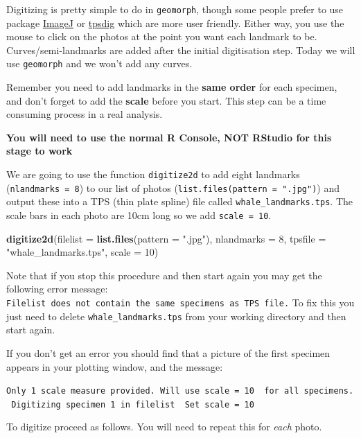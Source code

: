 \documentclass[]{book}
\newenvironment{Shaded}{\begin{snugshade}}{\end{snugshade}}
\newcommand{\KeywordTok}[1]{\textcolor[rgb]{0.13,0.29,0.53}{\textbf{{#1}}}}
\newcommand{\DataTypeTok}[1]{\textcolor[rgb]{0.13,0.29,0.53}{{#1}}}
\newcommand{\DecValTok}[1]{\textcolor[rgb]{0.00,0.00,0.81}{{#1}}}
\newcommand{\StringTok}[1]{\textcolor[rgb]{0.31,0.60,0.02}{{#1}}}
\newcommand{\NormalTok}[1]{{#1}}
\theoremstyle{definition}
\theoremstyle{definition}
\theoremstyle{definition}
\theoremstyle{remark}
\begin{document}
Digitizing is pretty simple to do in \texttt{geomorph}, though some
people prefer to use package
\href{https://imagej.nih.gov/ij/download.html}{ImageJ} or
\href{http://life.bio.sunysb.edu/morph/soft-dataacq.html}{tpsdig} which
are more user friendly. Either way, you use the mouse to click on the
photos at the point you want each landmark to be. Curves/semi-landmarks
are added after the initial digitisation step. Today we will use
\texttt{geomorph} and we won't add any curves.

Remember you need to add landmarks in the \textbf{same order} for each
specimen, and don't forget to add the \textbf{scale} before you start.
This step can be a time consuming process in a real analysis.

\textbf{You will need to use the normal R Console, NOT RStudio for this
stage to work}

We are going to use the function \texttt{digitize2d} to add eight
landmarks (\texttt{nlandmarks\ =\ 8}) to our list of photos
(\texttt{list.files(pattern\ =\ ".jpg")}) and output these into a TPS
(thin plate spline) file called \texttt{whale\_landmarks.tps}. The scale
bars in each photo are 10cm long so we add \texttt{scale\ =\ 10}.

\begin{Shaded}
\begin{Highlighting}[]
\KeywordTok{digitize2d}\NormalTok{(}\DataTypeTok{filelist =} \KeywordTok{list.files}\NormalTok{(}\DataTypeTok{pattern =} \StringTok{".jpg"}\NormalTok{),}
           \DataTypeTok{nlandmarks =} \DecValTok{8}\NormalTok{, }\DataTypeTok{tpsfile =} \StringTok{"whale_landmarks.tps"}\NormalTok{, }\DataTypeTok{scale =} \DecValTok{10}\NormalTok{)}
\end{Highlighting}
\end{Shaded}

Note that if you stop this procedure and then start again you may get
the following error message:
\texttt{Filelist\ does\ not\ contain\ the\ same\ specimens\ as\ TPS\ file.}
To fix this you just need to delete \texttt{whale\_landmarks.tps} from
your working directory and then start again.

If you don't get an error you should find that a picture of the first
specimen appears in your plotting window, and the message:

\texttt{Only\ 1\ scale\ measure\ provided.\ Will\ use\ scale\ =\ 10\ \ for\ all\ specimens.\ Digitizing\ specimen\ 1\ in\ filelist\ \ Set\ scale\ =\ 10}

To digitize proceed as follows. You will need to repeat this for
\emph{each} photo.
\end{document}
